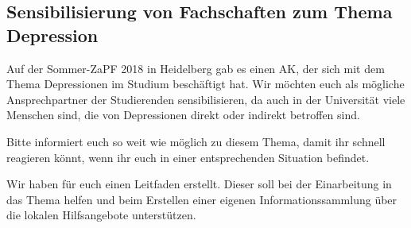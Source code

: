 
\subsection{Sensibilisierung von Fachschaften zum Thema Depression}
Auf der Sommer-ZaPF 2018 in Heidelberg gab es einen AK, der sich mit dem Thema Depressionen im Studium beschäftigt hat.
Wir möchten euch als mögliche Ansprechpartner der Studierenden sensibilisieren, da auch in der Universität viele Menschen sind, die von Depressionen direkt oder indirekt betroffen sind.

Bitte informiert euch so weit wie möglich zu diesem Thema, damit ihr schnell reagieren könnt, wenn ihr euch in einer entsprechenden Situation befindet.

Wir haben für euch einen Leitfaden erstellt. Dieser soll bei der Einarbeitung in das Thema helfen und beim Erstellen einer eigenen Informationssammlung über die lokalen Hilfsangebote unterstützen.

